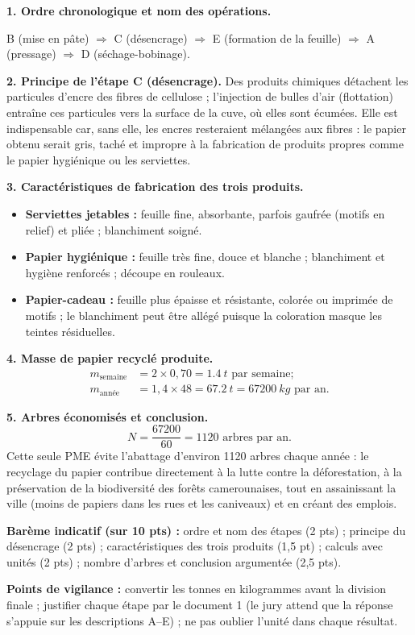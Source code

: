 \documentclass[11pt]{article}
\newcommand{\cle}[1]{{\popxbold\color{popdark}#1}}
\begin{document}
\begin{corrige}
\textbf{1. Ordre chronologique et nom des opérations.}
\begin{center}
B (mise en pâte) $\Rightarrow$ C (désencrage) $\Rightarrow$ E (formation de la feuille) $\Rightarrow$ A (pressage) $\Rightarrow$ D (séchage-bobinage).
\end{center}

\textbf{2. Principe de l'étape C (désencrage).} Des produits chimiques détachent les particules d'encre des fibres de cellulose ; l'injection de bulles d'air (flottation) entraîne ces particules vers la surface de la cuve, où elles sont écumées. Elle est indispensable car, sans elle, les encres resteraient mélangées aux fibres : le papier obtenu serait gris, taché et impropre à la fabrication de produits propres comme le papier hygiénique ou les serviettes.

\textbf{3. Caractéristiques de fabrication des trois produits.}
\begin{itemize}
\item \textbf{Serviettes jetables :} feuille fine, absorbante, parfois gaufrée (motifs en relief) et pliée ; blanchiment soigné.
\item \textbf{Papier hygiénique :} feuille très fine, douce et blanche ; blanchiment et hygiène renforcés ; découpe en rouleaux.
\item \textbf{Papier-cadeau :} feuille plus épaisse et résistante, \cle{colorée} ou imprimée de motifs ; le blanchiment peut être allégé puisque la coloration masque les teintes résiduelles.
\end{itemize}

\textbf{4. Masse de papier recyclé produite.}
\begin{align*}
m_{\text{semaine}} &= 2 \times 0{,}70 = \SI{1,4}{t} \text{ par semaine} ;\\
m_{\text{année}} &= 1{,}4 \times 48 = \SI{67,2}{t} = \SI{67200}{kg} \text{ par an}.
\end{align*}

\textbf{5. Arbres économisés et conclusion.}
\[ N = \dfrac{67200}{60} = 1120 \text{ arbres par an}. \]
Cette seule PME évite l'abattage d'environ \num{1120} arbres chaque année : le recyclage du papier contribue directement à la \cle{lutte contre la déforestation}, à la préservation de la biodiversité des forêts camerounaises, tout en assainissant la ville (moins de papiers dans les rues et les caniveaux) et en créant des emplois.

\textbf{Barème indicatif (sur 10 pts) :} ordre et nom des étapes (2 pts) ; principe du désencrage (2 pts) ; caractéristiques des trois produits (1,5 pt) ; calculs avec unités (2 pts) ; nombre d'arbres et conclusion argumentée (2,5 pts).

\textbf{Points de vigilance :} convertir les tonnes en kilogrammes avant la division finale ; justifier chaque étape par le document 1 (le jury attend que la réponse s'appuie sur les descriptions A--E) ; ne pas oublier l'unité dans chaque résultat.
\end{corrige}
\end{document}
